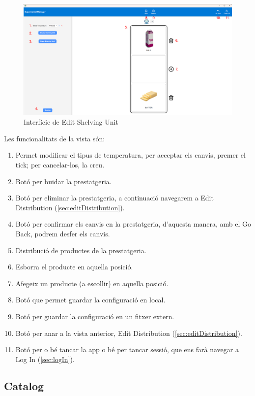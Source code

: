 \documentclass[a4paper,12pt]{article}
\begin{document}
	\begin{figure}[H] 
		\centering
		\includegraphics[width=0.75\linewidth]{assets/editshelvingunit.png}
		\caption{Interfície de Edit Shelving Unit}
	\end{figure}
	
	\noindent Les funcionalitats de la vista són:
	
	\begin{enumerate}[itemsep=0pt, topsep=0pt]
		\item Permet modificar el tipus de temperatura, per acceptar els canvis, premer el tick; per cancelar-los, la creu.
		\item Botó per buidar la prestatgeria.
		\item Botó per eliminar la prestatgeria, a continuació navegarem a Edit Distribution (\ref{sec:editDistribution}).
		\item Botó per confirmar els canvis en la prestatgeria, d'aquesta manera, amb el Go Back, podrem desfer els canvis.
		\item Distribució de productes de la prestatgeria.
		\item Esborra el producte en aquella posició.
		\item Afegeix un producte (a escollir) en aquella posició.
		\item Botó que permet guardar la configuració en local.
		\item Botó per guardar la configuració en un fitxer extern.
		\item Botó per anar a la vista anterior, Edit Distribution (\ref{sec:editDistribution}).
		\item Botó per o bé tancar la app o bé per tancar sessió, que ens farà navegar a Log In (\ref{sec:logIn}).
		
	\end{enumerate}
	
	\newpage
	\subsection{Catalog}
	\label{sec:catalog}
	
\end{document}
